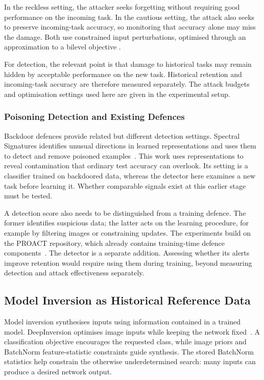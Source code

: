 In the reckless setting, the attacker seeks forgetting without requiring
good performance on the incoming task. In the cautious setting, the attack
also seeks to preserve incoming-task accuracy, so monitoring that accuracy
alone may miss the damage. Both use constrained input perturbations,
optimised through an approximation to a bilevel objective
\cite{abbasi2024brainwash}.

For detection, the relevant point is that damage to historical tasks may
remain hidden by acceptable performance on the new task. Historical retention
and incoming-task accuracy are therefore measured separately. The attack
budgets and optimisation settings used here are given in the experimental
setup.

\subsubsection{Poisoning Detection and Existing Defences}

Backdoor defences provide related but different detection settings. Spectral
Signatures identifies unusual directions in learned representations and uses
them to detect and remove poisoned examples~\cite{tran2018spectral}. This
work uses representations to reveal contamination that ordinary test
accuracy can overlook. Its setting is a classifier trained on backdoored
data, whereas the detector here examines a new task before learning it.
Whether comparable signals exist at this earlier stage must be tested.

A detection score also needs to be distinguished from a training defence.
The former identifies suspicious data; the latter acts on the learning
procedure, for example by filtering images or constraining updates. The
experiments build on the PROACT repository, which already contains
training-time defence components~\cite{proactsoftware}. The detector is a
separate addition. Assessing whether its alerts improve retention would
require using them during training, beyond measuring detection and attack
effectiveness separately.

\subsection{Model Inversion as Historical Reference Data}
\label{subsec:bg-inversion}

Model inversion synthesises inputs using information contained in a trained
model. DeepInversion optimises image inputs while keeping the network
fixed~\cite{yin2020deepinversion}. A classification objective encourages
the requested class, while image priors and BatchNorm feature-statistic
constraints guide synthesis. The stored BatchNorm statistics help constrain
the otherwise underdetermined search: many inputs can produce a desired
network output.

